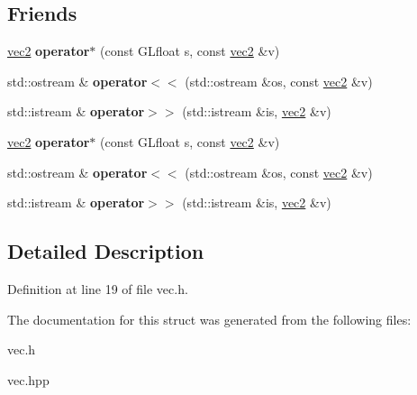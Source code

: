 \subsection*{\-Friends}
\begin{DoxyCompactItemize}
\item 
\hypertarget{struct_angel_1_1vec2_a1f371c4b26f86deb4d296dfff8ff1fc1}{\hyperlink{struct_angel_1_1vec2}{vec2} {\bfseries operator$\ast$} (const \-G\-Lfloat s, const \hyperlink{struct_angel_1_1vec2}{vec2} \&v)}\label{struct_angel_1_1vec2_a1f371c4b26f86deb4d296dfff8ff1fc1}

\item 
\hypertarget{struct_angel_1_1vec2_a5533e582fe94db90861caa394494f2cf}{std\-::ostream \& {\bfseries operator$<$$<$} (std\-::ostream \&os, const \hyperlink{struct_angel_1_1vec2}{vec2} \&v)}\label{struct_angel_1_1vec2_a5533e582fe94db90861caa394494f2cf}

\item 
\hypertarget{struct_angel_1_1vec2_af8cf130207f2cf5866ac13049e956c75}{std\-::istream \& {\bfseries operator$>$$>$} (std\-::istream \&is, \hyperlink{struct_angel_1_1vec2}{vec2} \&v)}\label{struct_angel_1_1vec2_af8cf130207f2cf5866ac13049e956c75}

\item 
\hypertarget{struct_angel_1_1vec2_a1f371c4b26f86deb4d296dfff8ff1fc1}{\hyperlink{struct_angel_1_1vec2}{vec2} {\bfseries operator$\ast$} (const \-G\-Lfloat s, const \hyperlink{struct_angel_1_1vec2}{vec2} \&v)}\label{struct_angel_1_1vec2_a1f371c4b26f86deb4d296dfff8ff1fc1}

\item 
\hypertarget{struct_angel_1_1vec2_a5533e582fe94db90861caa394494f2cf}{std\-::ostream \& {\bfseries operator$<$$<$} (std\-::ostream \&os, const \hyperlink{struct_angel_1_1vec2}{vec2} \&v)}\label{struct_angel_1_1vec2_a5533e582fe94db90861caa394494f2cf}

\item 
\hypertarget{struct_angel_1_1vec2_af8cf130207f2cf5866ac13049e956c75}{std\-::istream \& {\bfseries operator$>$$>$} (std\-::istream \&is, \hyperlink{struct_angel_1_1vec2}{vec2} \&v)}\label{struct_angel_1_1vec2_af8cf130207f2cf5866ac13049e956c75}

\end{DoxyCompactItemize}


\subsection{\-Detailed \-Description}


\-Definition at line 19 of file vec.\-h.



\-The documentation for this struct was generated from the following files\-:\begin{DoxyCompactItemize}
\item 
vec.\-h\item 
vec.\-hpp\end{DoxyCompactItemize}
